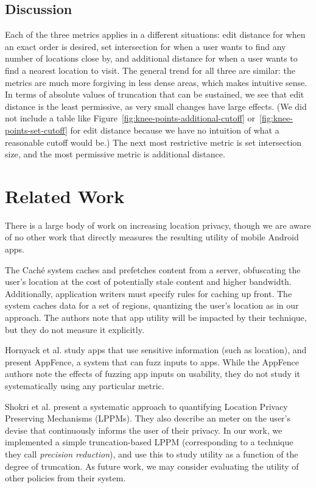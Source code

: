 \documentclass[10pt, conference, compsocconf]{IEEEtran}
\begin{document}
\subsection{Discussion}

Each of the three metrics applies in a different situations: edit
distance for when an exact order is desired, set intersection for when
a user wants to find any number of locations close by, and additional
distance for when a user wants to find a nearest location to visit.
The general trend for all three are similar: the metrics are much
more forgiving in less dense areas, which makes intuitive sense. In
terms of absolute values of truncation that can be sustained, we see
that edit distance is the least permissive, as very small changes have
large effects. (We did not include a table like
Figure~\ref{fig:knee-points-additional-cutoff}
or~\ref{fig:knee-points-set-cutoff} for edit distance because we have
no intuition of what a reasonable cutoff would be.) The next most
restrictive metric is set intersection size, and the most permissive
metric is additional distance.

\section{Related Work}

There is a large body of work on increasing location
privacy, though we are aware of no other work that directly measures
the resulting utility of mobile Android apps.

The Cach\'{e} system \cite{Amini:2010} caches and prefetches
content from a server, obfuscating the user's location at the cost of
potentially stale content and higher bandwidth.  Additionally,
application writers must specify rules for caching up front.  The
system caches data for a set of regions, quantizing the user's location 
as in our approach.  
The authors note that app utility will be impacted by their technique, 
but they do not measure it explicitly.

Hornyack et al. \cite{Hornyack:2011} study apps that use sensitive
information (such as location), and present AppFence, a system that
can fuzz inputs to apps. While the AppFence authors note the effects of
fuzzing app inputs on usability, they do not study it systematically
using any particular metric.

Shokri et al. \cite{Shokri:2011} present a systematic approach to
quantifying Location Privacy Preserving Mechanisms (LPPMs).  They also
describe an meter on the user's devise that
continuously informs the user of their privacy.  In our work, we implemented a simple
truncation-based LPPM (corresponding to a technique they call
\emph{precision reduction}), and use this to study
utility as a function of the degree of truncation. As future work, we
may consider evaluating the utility of other policies from their
system.
\end{document}
